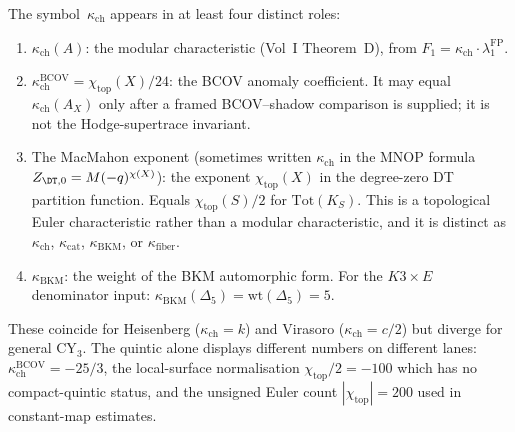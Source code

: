 \begin{remark}
\label{rem:cy3-kappa-polysemy}
The symbol~$\kappa_{\mathrm{ch}}$ appears in at least four distinct roles:
\begin{enumerate}[label=(\roman*)]
 \item $\kappa_{\mathrm{ch}}(A)$: the modular characteristic (Vol~I Theorem~D), from $F_1 = \kappa_{\mathrm{ch}} \cdot \lambda_1^{\mathrm{FP}}$.
 \item $\kappa_{\mathrm{ch}}^{\mathrm{BCOV}}=\chi_{\mathrm{top}}(X)/24$: the BCOV anomaly coefficient. It may equal~$\kappa_{\mathrm{ch}}(A_X)$ only after a framed BCOV--shadow comparison is supplied; it is not the Hodge-supertrace invariant.
 \item The MacMahon exponent (sometimes written $\kappa_{\mathrm{ch}}$ in the MNOP formula $Z_{\DT,0} = M(-q)^{\chi(X)}$): the exponent $\chi_{\mathrm{top}}(X)$ in the degree-zero DT partition function. Equals $\chi_{\mathrm{top}}(S)/2$ for $\mathrm{Tot}(K_S)$. This is a topological Euler characteristic rather than a modular characteristic, and it is distinct as $\kappa_{\mathrm{ch}}$, $\kappa_{\mathrm{cat}}$, $\kappa_{\mathrm{BKM}}$, or $\kappa_{\mathrm{fiber}}$.
 \item $\kappa_{\mathrm{BKM}}$: the weight of the BKM automorphic form. For the $K3 \times E$ denominator input: $\kappa_{\mathrm{BKM}}(\Delta_5) = \mathrm{wt}(\Delta_5) = 5$.
\end{enumerate}
These coincide for Heisenberg ($\kappa_{\mathrm{ch}} = k$) and Virasoro ($\kappa_{\mathrm{ch}} = c/2$) but diverge for general CY$_3$. The quintic alone displays different numbers on different lanes: $\kappa_{\mathrm{ch}}^{\mathrm{BCOV}}=-25/3$, the local-surface normalisation $\chi_{\mathrm{top}}/2=-100$ which has no compact-quintic status, and the unsigned Euler count $|\chi_{\mathrm{top}}|=200$ used in constant-map estimates.
\end{remark}


